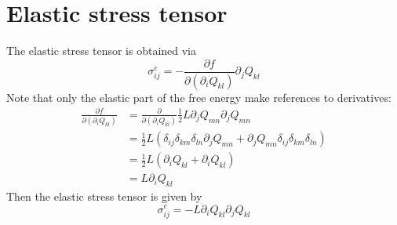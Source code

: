 \documentclass[reqno]{article}
\begin{document}
	\section{Elastic stress tensor}
	The elastic stress tensor is obtained via
	\begin{equation}
	\sigma^{e}_{ij} = -\frac{\partial f}{\partial (\partial_i Q_{kl})} \partial_j Q_{kl}
	\end{equation}
	Note that only the elastic part of the free energy make references to derivatives:
	\begin{equation}
	\begin{split}
		\frac{\partial f}{\partial (\partial_i Q_{kl})} &= \frac{\partial}{\partial (\partial_i Q_{kl})} \frac{1}{2} L \partial_j Q_{mn} \partial_j Q_{mn} \\
		&= \frac{1}{2} L (\delta_{ij}\delta_{km}\delta_{ln} \partial_j Q_{mn} + \partial_j Q_{mn} \delta_{ij}\delta_{km}\delta_{ln}) \\
		&= \frac{1}{2} L (\partial_i Q_{kl} + \partial_i Q_{kl}) \\
		&= L\partial_i Q_{kl}
	\end{split}
	\end{equation}
	Then the elastic stress tensor is given by
	\begin{equation}\label{eq:elastic-stress}
		\sigma^e_{ij} = -L\partial_i Q_{kl} \partial_j Q_{kl}
	\end{equation}
	
\end{document}
